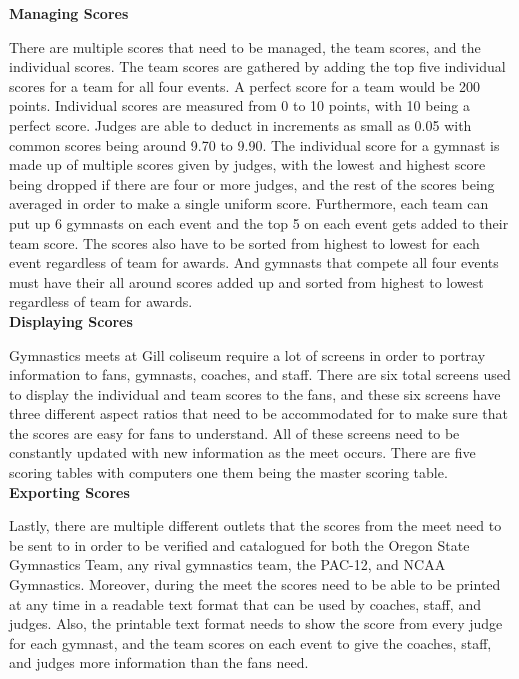 \documentclass[letterpaper,10pt,draftclsnofoot,onecolumn,]{IEEEtran}
\begin{document}
\textbf{Managing Scores}
\par There are multiple scores that need to be managed, the team scores, and the individual scores. The team scores are gathered by adding the top five individual scores for a team for all four events. A perfect score for a team would be 200 points. Individual scores are measured from 0 to 10 points, with 10 being a perfect score. Judges are able to deduct in increments as small as 0.05 with common scores being around 9.70 to 9.90. The individual score for a gymnast is made up of multiple scores given by judges, with the lowest and highest score being dropped if there are four or more judges, and the rest of the scores being averaged in order to make a single uniform score. Furthermore, each team can put up 6 gymnasts on each event and the top 5 on each event gets added to their team score. The scores also have to be sorted from highest to lowest for each event regardless of team for awards. And gymnasts that compete all four events must have their all around scores added up and sorted from highest to lowest regardless of team for awards.\\

\textbf{Displaying Scores}
\par Gymnastics meets at Gill coliseum require a lot of screens in order to portray information to fans, gymnasts, coaches, and staff. There are six total screens used to display the individual and team scores to the fans, and these six screens have three different aspect ratios that need to be accommodated for to make sure that the scores are easy for fans to understand. All of these screens need to be constantly updated with new information as the meet occurs. There are five scoring tables with computers one them being the master scoring table.\\

\textbf{Exporting Scores}
\par Lastly, there are multiple different outlets that the scores from the meet need to be sent to in order to be verified and catalogued for both the Oregon State Gymnastics Team, any rival gymnastics team, the PAC-12, and NCAA Gymnastics. Moreover, during the meet the scores need to be able to be printed at any time in a readable text format that can be used by coaches, staff, and judges. Also, the printable text format needs to show the score from every judge for each gymnast, and the team scores on each event to give the coaches, staff, and judges more information than the fans need.\\
\end{document}
